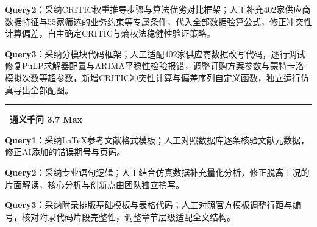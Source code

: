 \documentclass[12pt,a4paper]{ctexart}
\begin{document}
\textbf{Query2：}采纳CRITIC权重推导步骤与算法优劣对比框架；人工补充402家供应商数据特征与55家筛选的业务约束等专属条件，代入全部数据验算公式，修正冲突性计算偏差，自主确定CRITIC与熵权法稳健性验证策略。

\textbf{Query3：}采纳分模块代码框架；人工适配402家供应商数据改写代码，逐行调试修复PuLP求解器配置与ARIMA平稳性检验报错，调整订购方案参数与蒙特卡洛模拟次数等超参数，新增CRITIC冲突性计算与偏差序列自定义函数，独立运行仿真导出全部配图。

\noindent\rule{\linewidth}{0.4pt}

\noindent\textbf{\textbullet~通义千问 3.7 Max}

\textbf{Query1：}采纳LaTeX参考文献格式模板；人工对照数据库逐条核验文献元数据，修正AI添加的错误期号与页码。

\textbf{Query2：}采纳专业语句逻辑；人工结合仿真数据补充量化分析，修正脱离工况的片面解读，核心分析与创新点由团队独立撰写。

\textbf{Query3：}采纳附录排版基础模板与表格代码；人工对照官方模板调整行距与编号，核对附录代码片段完整性，调整章节层级适配全文结构。
\end{document}
